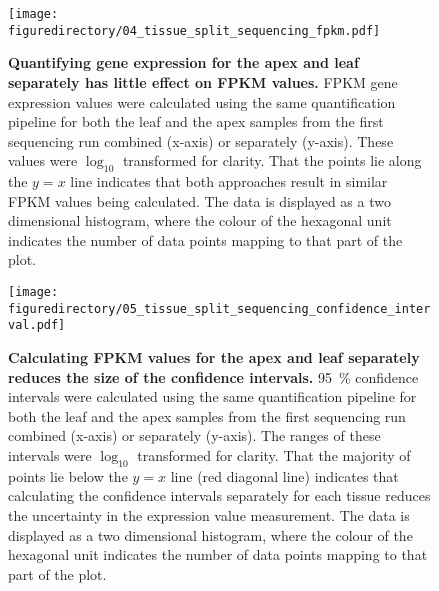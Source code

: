 \documentclass[12pt,]{book}
\begin{document}
\begin{figure}[htbp]
\centering
\texttt{[image: figuredirectory/04\_tissue\_split\_sequencing\_fpkm.pdf]}
\caption{\textbf{Quantifying gene expression for the apex and leaf
separately has little effect on FPKM values.} FPKM gene expression
values were calculated using the same quantification pipeline for both
the leaf and the apex samples from the first sequencing run combined
(x-axis) or separately (y-axis). These values were \(\log_{10}\)
transformed for clarity. That the points lie along the \(y = x\) line
indicates that both approaches result in similar FPKM values being
calculated. The data is displayed as a two dimensional histogram, where
the colour of the hexagonal unit indicates the number of data points
mapping to that part of the plot.}\label{figure:204:tissuesplitfpkm}
\end{figure}

\begin{figure}[htbp]
\centering
\texttt{[image: figuredirectory/05\_tissue\_split\_sequencing\_confidence\_interval.pdf]}
\caption{\textbf{Calculating FPKM values for the apex and leaf
separately reduces the size of the confidence intervals.} 95~\%
confidence intervals were calculated using the same quantification
pipeline for both the leaf and the apex samples from the first
sequencing run combined (x-axis) or separately (y-axis). The ranges of
these intervals were \(\log_{10}\) transformed for clarity. That the
majority of points lie below the \(y = x\) line (red diagonal line)
indicates that calculating the confidence intervals separately for each
tissue reduces the uncertainty in the expression value measurement. The
data is displayed as a two dimensional histogram, where the colour of
the hexagonal unit indicates the number of data points mapping to that
part of the plot.}\label{figure:205:tissuesplitconf}
\end{figure}
\end{document}
